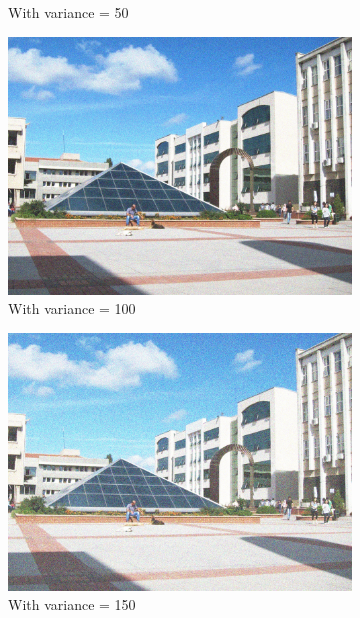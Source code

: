 \documentclass[12pt]{article}
\begin{document}
\begin{figure}[H]
\begin{subfigure}{0.45\textwidth}
        \caption{With variance = 50}
        \label{noise-var-50}
    \end{subfigure}
    \begin{subfigure}{0.45\textwidth}
        \centering
        \includegraphics[height=0.75\textwidth]{images/kuzey-var-100.jpg}
        \caption{With variance = 100}
        \label{noise-var-100}
    \end{subfigure}
    \begin{subfigure}{0.45\textwidth}
        \centering
        \includegraphics[height=0.75\textwidth]{images/kuzey-var-150.jpg}
        \caption{With variance = 150}
        \label{noise-150}
    \end{subfigure}
    \begin{subfigure}{0.45\textwidth}

\end{subfigure}
\end{figure}
\end{document}
